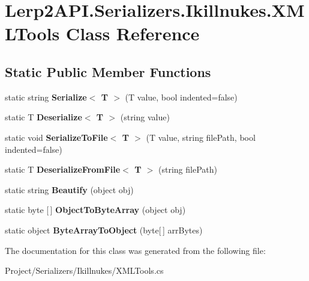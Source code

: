 \hypertarget{class_lerp2_a_p_i_1_1_serializers_1_1_ikillnukes_1_1_x_m_l_tools}{}\section{Lerp2\+A\+P\+I.\+Serializers.\+Ikillnukes.\+X\+M\+L\+Tools Class Reference}
\label{class_lerp2_a_p_i_1_1_serializers_1_1_ikillnukes_1_1_x_m_l_tools}
\subsection*{Static Public Member Functions}
\begin{DoxyCompactItemize}
\item 
\mbox{\label{class_lerp2_a_p_i_1_1_serializers_1_1_ikillnukes_1_1_x_m_l_tools_afa51b83b4d1475e4a2e0bf8bc26c5569}} 
static string {\bfseries Serialize$<$ T $>$} (T value, bool indented=false)
\item 
\mbox{\label{class_lerp2_a_p_i_1_1_serializers_1_1_ikillnukes_1_1_x_m_l_tools_a108fbe03d5e7378ad8018b3de077c040}} 
static T {\bfseries Deserialize$<$ T $>$} (string value)
\item 
\mbox{\label{class_lerp2_a_p_i_1_1_serializers_1_1_ikillnukes_1_1_x_m_l_tools_a39326a453a18256363333bd8bb20027c}} 
static void {\bfseries Serialize\+To\+File$<$ T $>$} (T value, string file\+Path, bool indented=false)
\item 
\mbox{\label{class_lerp2_a_p_i_1_1_serializers_1_1_ikillnukes_1_1_x_m_l_tools_a063504065b7d80b5e7f69d9557c64d6f}} 
static T {\bfseries Deserialize\+From\+File$<$ T $>$} (string file\+Path)
\item 
\mbox{\label{class_lerp2_a_p_i_1_1_serializers_1_1_ikillnukes_1_1_x_m_l_tools_a206e7a447276635f61e93517e2d476fa}} 
static string {\bfseries Beautify} (object obj)
\item 
\mbox{\label{class_lerp2_a_p_i_1_1_serializers_1_1_ikillnukes_1_1_x_m_l_tools_abdef846ad67f78da4456042e2dec3865}} 
static byte \mbox{[}$\,$\mbox{]} {\bfseries Object\+To\+Byte\+Array} (object obj)
\item 
\mbox{\label{class_lerp2_a_p_i_1_1_serializers_1_1_ikillnukes_1_1_x_m_l_tools_a71f21ce9684f1b93261716692fd55847}} 
static object {\bfseries Byte\+Array\+To\+Object} (byte\mbox{[}$\,$\mbox{]} arr\+Bytes)
\end{DoxyCompactItemize}


The documentation for this class was generated from the following file\+:\begin{DoxyCompactItemize}
\item 
Project/\+Serializers/\+Ikillnukes/X\+M\+L\+Tools.\+cs\end{DoxyCompactItemize}
